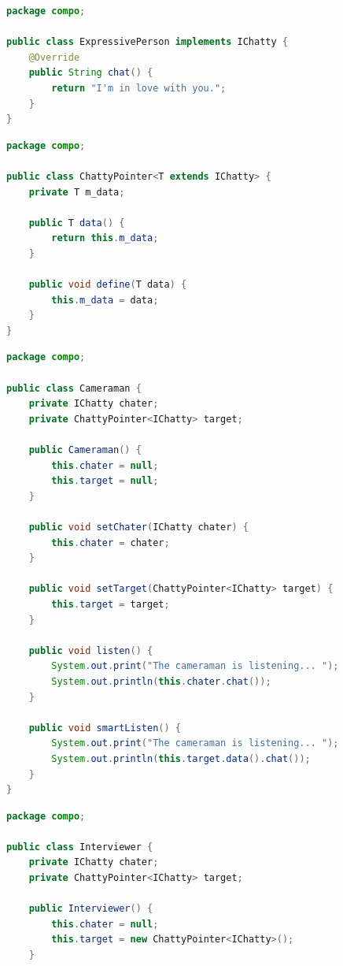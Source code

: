 \documentclass[11pt,a4paper,openany,oneside]{book}
\begin{document}
\begin{appendices}
\begin{lstlisting}[language=Java, frame=single, caption=ExpressivePerson]
package compo;

public class ExpressivePerson implements IChatty {
    @Override
    public String chat() {
        return "I'm in love with you.";
    }
}
\end{lstlisting}

\begin{lstlisting}[language=Java, frame=single, caption=ChattyPointer]
package compo;

public class ChattyPointer<T extends IChatty> {
    private T m_data;

    public T data() {
        return this.m_data;
    }

    public void define(T data) {
        this.m_data = data;
    }
}
\end{lstlisting}

\clearpage

\begin{lstlisting}[language=Java, frame=single, caption=Cameraman]
package compo;

public class Cameraman {
    private IChatty chater;
    private ChattyPointer<IChatty> target;

    public Cameraman() {
        this.chater = null;
        this.target = null;
    }

    public void setChater(IChatty chater) {
        this.chater = chater;
    }

    public void setTarget(ChattyPointer<IChatty> target) {
        this.target = target;
    }

    public void listen() {
        System.out.print("The cameraman is listening... ");
        System.out.println(this.chater.chat());
    }

    public void smartListen() {
        System.out.print("The cameraman is listening... ");
        System.out.println(this.target.data().chat());
    }
}
\end{lstlisting}

\clearpage

\begin{lstlisting}[language=Java, frame=single, caption=Interviewer]
package compo;

public class Interviewer {
    private IChatty chater;
    private ChattyPointer<IChatty> target;

    public Interviewer() {
        this.chater = null;
        this.target = new ChattyPointer<IChatty>();
    }


\end{lstlisting}
\end{appendices}
\end{document}
